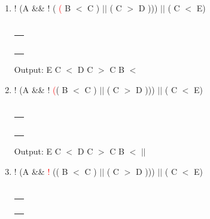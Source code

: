 \documentclass[a4paper]{article}
\begin{document}
\begin{large}
\begin{enumerate}
    \item
          ! (A \&\& ! ( \textcolor{red}{(} B $<$ C ) $||$ ( C $>$ D ))) $||$ ( C $<$ E)\\
          \\
          \begin{tabular}[t]{ | p{1.6em} | }
            \makecell{}       \\ \hline
            \makecell{}       \\ \hline
            \makecell{$||$}   \\ \hline
            \makecell{)}      \\ \hline
            \makecell{)}      \\ \hline
            \makecell{ $||$ } \\ \hline
          \end{tabular}
          \hspace{2em}
          Output: E C $<$ D C $>$ C B $<$
    \item
          ! (A \&\& !  \textcolor{red}{(}( B $<$ C ) $||$ ( C $>$ D ))) $||$ ( C $<$ E)\\
          \\
          \begin{tabular}[t]{ | p{1.6em} | }
            \makecell{}       \\ \hline
            \makecell{}       \\ \hline
            \makecell{}       \\ \hline
            \makecell{}       \\ \hline
            \makecell{)}      \\ \hline
            \makecell{ $||$ } \\ \hline
          \end{tabular}
          \hspace{2em}
          Output: E C $<$ D C $>$ C B $<$ $||$
    \item
          ! (A \&\& \textcolor{red}{!} (( B $<$ C ) $||$ ( C $>$ D ))) $||$ ( C $<$ E)\\
          \\
          \begin{tabular}[t]{ | p{1.6em} | }
            \makecell{}       \\ \hline
            \makecell{}       \\ \hline
            \makecell{}       \\ \hline
            \makecell{!}      \\ \hline
            \makecell{)}      \\ \hline

\end{tabular}
\end{enumerate}
\end{large}
\end{document}
